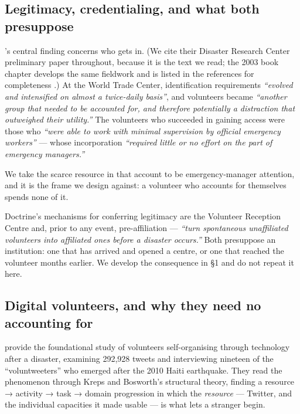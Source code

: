 \subsection{Legitimacy, credentialing, and what both presuppose}

\citeauthor{kendra2002}'s \citeyearpar{kendra2002} central finding concerns who gets in. (We cite
their Disaster Research Center preliminary paper throughout, because it
is the text we read; the 2003 book chapter develops the same fieldwork
and is listed in the references for completeness \nocite{kendra2003}.) At the World Trade
Center, identification requirements \emph{``evolved and intensified on
almost a twice-daily basis''}, and volunteers became \emph{``another
group that needed to be accounted for, and therefore potentially a
distraction that outweighed their utility.''} The volunteers who
succeeded in gaining access were those who \emph{``were able to work
with minimal supervision by official emergency workers''} --- whose
incorporation \emph{``required little or no effort on the part of
emergency managers.''}

We take the scarce resource in that account to be emergency-manager
attention, and it is the frame we design against: a volunteer who
accounts for themselves spends none of it.

Doctrine's mechanisms for conferring legitimacy are the Volunteer
Reception Centre and, prior to any event, pre-affiliation ---
\emph{``turn spontaneous unaffiliated volunteers into affiliated ones
before a disaster occurs.''} Both presuppose an institution: one that
has arrived and opened a centre, or one that reached the volunteer
months earlier. We develop the consequence in §1 and do not repeat it
here.

\subsection{Digital volunteers, and why they need no accounting for}

\citet{starbird2011} provide the foundational study of volunteers
self-organising through technology after a disaster, examining 292,928
tweets and interviewing nineteen of the ``voluntweeters'' who emerged
after the 2010 Haiti earthquake. They read the phenomenon through Kreps
and Bosworth's structural theory, finding a resource → activity → task →
domain progression in which the \emph{resource} --- Twitter, and the
individual capacities it made usable --- is what lets a stranger begin.

